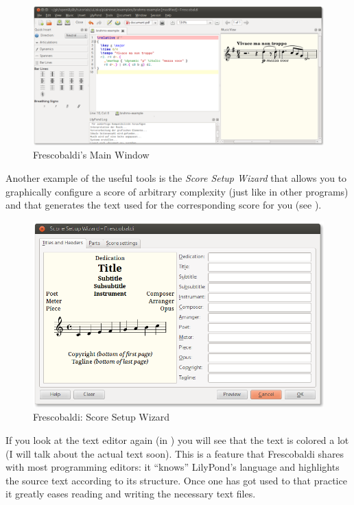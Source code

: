 \documentclass[DIV=12]{scrreprt}
\begin{document}
\begin{figure}
\includegraphics[max width=\textwidth]{examples/frescobaldi/main-window}
\caption{Frescobaldi's Main Window}
\label{fig:pt_fb-main-window}
\end{figure}

Another example of the useful tools is the \emph{Score Setup Wizard} that allows you to graphically configure a score of arbitrary complexity (just like in other programs) and that generates the text used for the corresponding score for you (see ).

\begin{figure}
\includegraphics[max width=\textwidth]{examples/frescobaldi/score-wizard}
\caption{Frescobaldi: Score Setup Wizard}
\label{fig:pt_fb-score-setup-wizard}
\end{figure}

If you look at the text editor again (in ) you will see that the text is colored a lot (I will talk about the actual text soon).
This is a feature that Frescobaldi shares with most programming editors: it “knows” LilyPond's language and highlights the source text according to its structure.
Once one has got used to that practice it greatly eases reading and writing the necessary text files.
\end{document}
